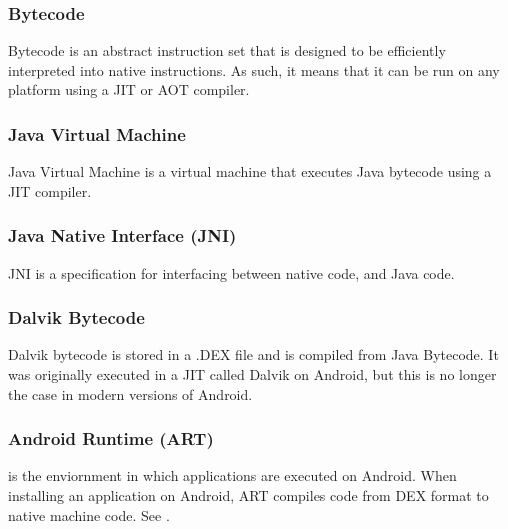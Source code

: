         \subsubsection{Bytecode} Bytecode is an abstract instruction set that is designed to be efficiently interpreted into native instructions. As such, it means that it can be run on any platform using a JIT or AOT compiler.
        \subsubsection{Java Virtual Machine} Java Virtual Machine is a virtual machine that executes Java bytecode using a JIT compiler.
        \subsubsection{Java Native Interface (JNI)} JNI is a specification for interfacing between native code, and Java code.
        \subsubsection{Dalvik Bytecode} Dalvik bytecode is stored in a .DEX file and is compiled from Java Bytecode. It was originally executed in a JIT called Dalvik on Android, but this is no longer the case in modern versions of Android. 
        \subsubsection{Android Runtime (ART)} is the enviornment in which applications are executed on Android. When installing an application on Android, ART compiles code from DEX format to native machine code. See \cite{androidart}.

